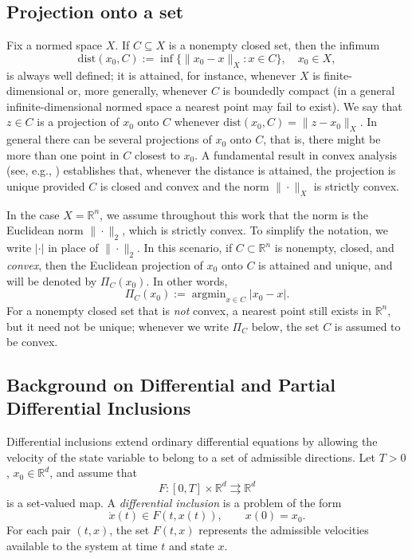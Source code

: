 \documentclass[11pt]{elsarticle}
\theoremstyle{definition}
\theoremstyle{remark}
\numberwithin{equation}{section}
\DeclareMathOperator{\argmin}{argmin}
\begin{document}
	
	
	\subsection{Projection onto a set} \label{sec:projection}
	
	Fix a normed space $X$.
	If $C \subseteq X$ is a nonempty closed set, then the infimum
	\begin{equation*}
		\text{dist}(x_0,C) := \inf\{\|x_0 - x\|_X : x \in C\}, \quad x_0 \in X,
	\end{equation*}
	is always well defined; it is attained, for instance, whenever $X$ is finite-dimensional or, more generally, whenever $C$ is boundedly compact (in a general infinite-dimensional normed space a nearest point may fail to exist). We say that $z\in C$ is a projection of $x_0$ onto $C$ whenever $\text{dist}(x_0,C)=\|z - x_0\|_X$. In general there can be several projections of $x_0$ onto $C$, that is, there might be more than one point in $C$ closest to $x_0$.
	A fundamental result in convex analysis (see, e.g., \cite[Section~8.1]{boyd_vandenberghe_2004}) establishes that, whenever the distance is attained, the projection is unique provided $C$ is closed and convex and the norm $\|\cdot\|_X$ is strictly convex.
	
	In the case $X=\mathbb{R}^n$, we assume throughout this work that the norm is the Euclidean norm $\|\cdot\|_2$, which is strictly convex. To simplify the notation, we write $|\cdot|$ in place of $\|\cdot\|_2$. In this scenario, if $C\subset\mathbb{R}^n$ is nonempty, closed, and \emph{convex}, then the Euclidean projection of $x_0$ onto $C$ is attained and unique, and will be denoted by $\Pi_C(x_0)$. In other words,
	\begin{equation}
		\Pi_{C}(x_0):=\argmin_{x\in C}|x_0-x|.
	\end{equation}
For a nonempty closed set that is \emph{not} convex, a nearest point still exists in $\mathbb{R}^n$, but it need not be unique; whenever we write $\Pi_C$ below, the set $C$ is assumed to be convex.
	
	
	\subsection{Background on Differential and Partial Differential Inclusions} \label{sec:basics}
	
	Differential inclusions extend ordinary differential equations by
	allowing the velocity of the state variable to belong to a set of
	admissible directions.  Let $T>0$, $x_0\in\mathbb{R}^d$, and assume that
	\[
	F:[0,T]\times\mathbb{R}^d\rightrightarrows\mathbb{R}^d
	\]
	is a set-valued map.  A \emph{differential inclusion} is a problem of
	the form
	\begin{equation}\label{eq:inclusion}
		\dot{x}(t)\in F(t,x(t)),\qquad x(0)=x_0.
	\end{equation}
	For each pair $(t,x)$, the set $F(t,x)$ represents the admissible
	velocities available to the system at time $t$ and state $x$.
	
\end{document}
